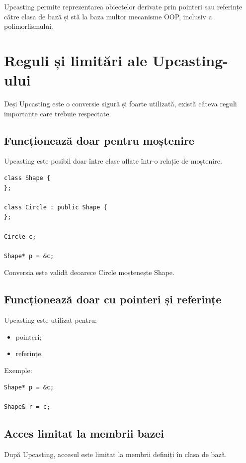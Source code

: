 \documentclass[12pt,a4paper]{article}
\begin{document}
Upcasting permite reprezentarea obiectelor derivate prin pointeri sau referințe către clasa de bază și stă la baza multor mecanisme OOP, inclusiv a polimorfismului.

\section{Reguli și limitări ale Upcasting-ului}

Deși Upcasting este o conversie sigură și foarte utilizată, există câteva reguli importante care trebuie respectate.

\subsection{Funcționează doar pentru moștenire}

Upcasting este posibil doar între clase aflate într-o relație de moștenire.

\begin{verbatim}
class Shape {
};

class Circle : public Shape {
};

Circle c;

Shape* p = &c;
\end{verbatim}

Conversia este validă deoarece Circle moștenește Shape.

\subsection{Funcționează doar cu pointeri și referințe}

Upcasting este utilizat pentru:

\begin{itemize}
\item pointeri;
\item referințe.
\end{itemize}

Exemple:

\begin{verbatim}
Shape* p = &c;

Shape& r = c;
\end{verbatim}

\subsection{Acces limitat la membrii bazei}

După Upcasting, accesul este limitat la membrii definiți în clasa de bază.
\end{document}

